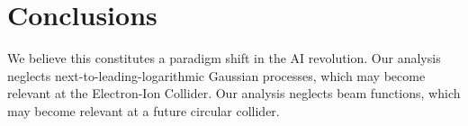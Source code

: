 \section{Conclusions}\label{sec:conclusions}

We believe this constitutes a paradigm shift in the AI revolution. Our
analysis neglects next-to-leading-logarithmic Gaussian processes, which
may become relevant at the Electron-Ion Collider. Our analysis neglects
beam functions, which may become relevant at a future circular collider.

